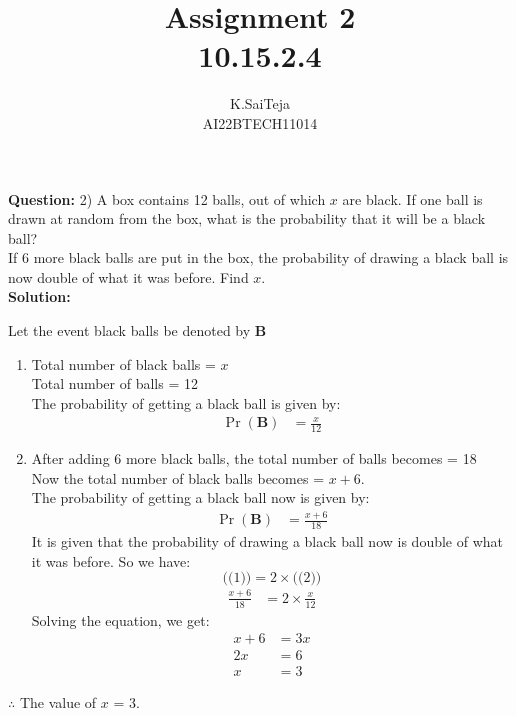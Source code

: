 \documentclass[journal,12pt,two column]{IEEEtran}
\title{Assignment 2 \\ 10.15.2.4}
\author{K.SaiTeja \\ AI22BTECH11014}
\providecommand{\pr}[1]{\ensuremath{\Pr\left(#1\right)}}
\newcommand{\question}{\noindent \textbf{Question: }}
\newcommand{\solution}{\noindent \textbf{Solution: }}
\begin{document}
\maketitle
\question 2)
A box contains 12 balls, out of which $x$ are black. If one ball is drawn at random from the box, what is the probability that it will be a black ball?\\ If 6 more black balls are put in the box, the probability of drawing a black ball is now double of what it was before. Find $x$.\\
\solution 
\begin{center}
Let the event black balls be denoted by \textbf B
\end{center}
\begin{enumerate}
  
    \item Total number of black balls = $x$\\
          Total number of balls = 12 \\
   The probability of getting a black ball is given by:
\begin{align}   
   \pr{\textbf{B}} &= \frac{x}{12} 
\end{align}  
  \item After adding 6 more black balls, the total number of balls becomes = 18 \\  
    Now the total number of black balls becomes = $x+6$.  \\
    The probability of getting a black ball now is given by:
\begin{align}  
  \pr{\textbf{B}} &= \frac{x+6}{18} 
\end{align}  
    It is given that the probability of drawing a black ball now is double of what it was before. So we have: 
   $$\text{((1))} = 2 \times \text{((2))}$$   
\begin{align}
  \frac{x+6}{18} &= 2 \times \frac{x}{12}  
\end{align}  
   Solving the equation, we get:
\begin{align}   
 x + 6 &= 3x \\
  2x &= 6 \\
  x &= 3
\end{align}
 
\end{enumerate}
\begin{center}
$\therefore$ The value of $x$ = 3.
\end{center}
\end{document}
